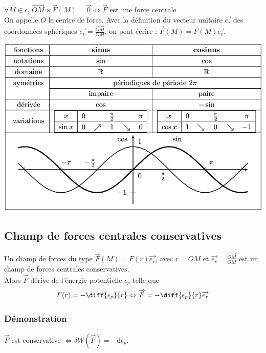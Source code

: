 \documentclass[a4paper,10pt]{book} %
\begin{document}
$\forall M\in \epsilon$, $\overrightarrow{OM}\times \overrightarrow{F}(M)=\overrightarrow{0} \Leftrightarrow \overrightarrow{F}$ est une force centrale\\

On appelle $O$ le centre de force. Avec la définition du vecteur unitaire $\overrightarrow{e_r}$ des coordonnées sphériques $\overrightarrow{e_r}=\frac{\overrightarrow{OM}}{OM}$, on peut écrire :
$\overrightarrow{F}(M)=F(M)\overrightarrow{e_r}$.\\

\begin{center}\includegraphics[scale=0.5]{images/010.png}\end{center}

\subsection{Champ de forces centrales conservatives}
Un champ de forces du type $\overrightarrow{F}(M)=F(r)\overrightarrow{e_r}$, avec $r=OM$ et $\overrightarrow{e_r}=\frac{\overrightarrow{OM}}{OM}$ est un champ de forces centrales conservatives.\\

Alors $\overrightarrow{F}$ dérive de l’énergie potentielle $\epsilon_p$ telle que $$F(r)=-\diff{\epsilon_p}{r}\Leftrightarrow \overrightarrow{F}=-\diff{\epsilon_p}{r}\overrightarrow{e_r}$$

\subsubsection{Démonstration}
$\overrightarrow{F}$ est conservative $\Leftrightarrow \delta W(\overrightarrow{F})=-\text{d}\epsilon_p$.\\
\end{document}
